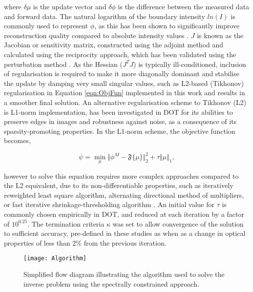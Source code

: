 \documentclass[twoside]{bhamthesis}
\theoremstyle{definition}
\begin{document}
where $\delta \mu$ is the update vector and $\delta \phi$ is the difference between the measured data and forward data. The natural logarithm of the boundary intensity $ln(I)$ is commonly used to represent $\phi$, as this has been shown to significantly improve reconstruction quality compared to absolute intensity values \cite{arridge1999optical}.  $J$ is known as the Jacobian or sensitivity matrix, constructed using the adjoint method and calculated using the reciprocity approach, which has been validated using the perturbation method \cite{arridge1995photon}. As the Hessian ($J^T J$) is typically ill-conditioned, inclusion of regularisation is required to make it more diagonally dominant and stabilise the update by damping very small singular values, such as L2-based (Tikhonov) regularisation \cite{tikhonov2013numerical} in Equation \ref{eqn:ObjFun} implemented in this work and results in a smoother final solution. An alternative regularisation scheme to Tikhonov (L2) is L1-norm implementation,  has been investigated in DOT for its abilities to preserve edges in images and robustness against noise, as a consequence of its sparsity-promoting properties. In the L1-norm scheme, the objective function becomes,

\begin{equation} 
 \psi = \min_{\mu} \Vert \phi^M - \mathfrak{F} \lbrace \mu \rbrace \Vert^2_2 + \tau \Vert \mu \Vert_1,
  \label{eqn:RTE}
\end{equation}

however to solve this equation requires more complex approaches compared to the L2 equivalent, due to its non-differentiable properties, such as iteratively reweighted least square algorithm, alternating directional method of multipliers, or fast iterative shrinkage-thresholding algorithm \cite{lu20181}.  An initial value for $\tau$ is commonly chosen empirically in DOT, and reduced at each iteration by a factor of $10^{0.25}$. The termination criteria $\kappa$ was set to allow convergence of the solution to sufficient accuracy, pre-defined in these studies as when as a change in optical properties of less than 2\% from the previous iteration.

\begin{figure}[!ht]
  \centering
  \texttt{[image: Algorithm]}
\caption{Simplified flow diagram illustrating the algorithm used to solve the inverse problem using the spectrally constrained approach.}
\label{fig:Inverse_algorithm}
\end{figure}
\end{document}
